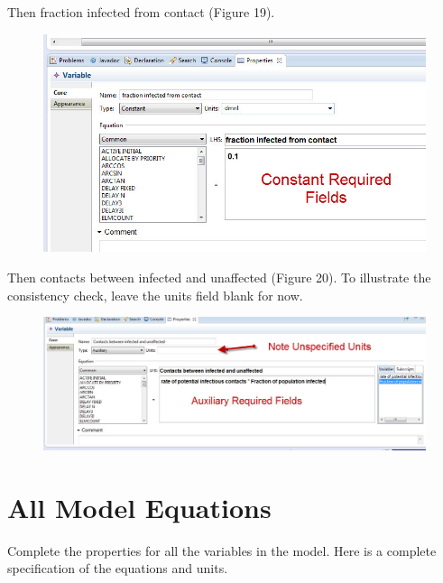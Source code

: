 \documentclass[11pt]{amsart}
\begin{document}
\clearpage

Then fraction infected from contact (Figure 19).


\begin{figure}[ht]
\begin{center}
\vspace{.2in}
\centerline {
\includegraphics[totalheight=0.3\textheight]{images/019.jpg}
}
\caption{}
\label{fig:019}
\end{center}
\end{figure}

Then contacts between infected and unaffected (Figure 20). To illustrate the consistency check, leave the units field blank for now.


\begin{figure}[ht]
\begin{center}
\vspace{.2in}
\centerline {
\includegraphics[totalheight=0.3\textheight]{images/020.jpg}
}
\caption{}
\label{fig:020}
\end{center}
\end{figure}

\section{All Model Equations}
Complete the properties for all the variables in the model. Here is a complete specification of the equations and units.
\end{document}
